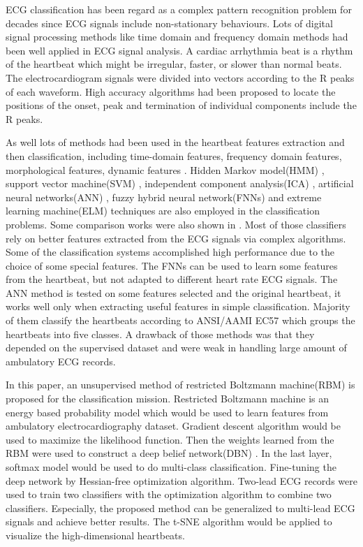 \documentclass[conference]{IEEEtran}
\begin{document}
ECG classification has been regard as a complex pattern recognition problem for decades since ECG signals include non-stationary behaviours.
Lots of digital signal processing methods like time domain and frequency domain methods had been well applied in ECG signal analysis.
A cardiac arrhythmia beat is a rhythm of the heartbeat which might be irregular, faster, or slower than normal beats. The electrocardiogram signals were divided into vectors according to the R peaks of each waveform. 
High accuracy algorithms \cite{Burke} had been proposed to locate the positions of the onset, peak and termination of individual components include the R peaks.
 
As well lots of methods had been used in the heartbeat features extraction and then classification, including time-domain features\cite{Tadejko}, frequency domain features\cite{Palreddy, Banerjee}, morphological features, dynamic features \cite{Can, Mar, Chaza, Ataollah}. 
Hidden Markov model(HMM) \cite{Andreao}, support vector machine(SVM) \cite{Asl, Melgani}, independent component analysis(ICA) \cite{Sung}, artificial neural networks(ANN) \cite{Hu, Krishna}, fuzzy hybrid neural network(FNNs) \cite{Osowski} and extreme learning machine(ELM)\cite{Karpa} techniques are also employed in the classification problems.
Some comparison works were also shown in \cite{Majid, Sung, Chu}. 
Most of those classifiers rely on better features extracted from the ECG signals via complex algorithms. 
Some of the classification systems accomplished high performance due to the choice of some special features.
The FNNs can be used to learn some features from the heartbeat, but not adapted to different heart rate ECG signals.
The ANN method is tested on some features selected and the original heartbeat, it works well only when extracting useful features in simple classification. 
Majority of them classify the heartbeats according to ANSI/AAMI EC57 which groups the heartbeats into five classes. 
A drawback of those methods was that they depended on the supervised dataset and were weak in handling large amount of ambulatory ECG records.

In this paper, an unsupervised method of restricted Boltzmann machine(RBM)\cite{Ruslan, Geoffrey} is proposed for the classification mission. Restricted Boltzmann machine is an energy based probability model which would be used to learn features from ambulatory electrocardiography dataset. Gradient descent algorithm\cite{Leon} would be used to maximize the likelihood function. Then the weights learned from the RBM were used to construct a deep belief network(DBN) \cite{Juergen, James, Xue, Bengio2007, Bengio2009}. In the last layer, softmax model would be used to do multi-class classification. Fine-tuning the deep network by Hessian-free optimization \cite{Basheer} algorithm. Two-lead ECG records were used to train two classifiers with the optimization algorithm to combine two classifiers. Especially, the proposed method can be generalized to multi-lead ECG signals and achieve better results. The t-SNE \cite{Van} algorithm would be applied to visualize the high-dimensional heartbeats.
\end{document}
